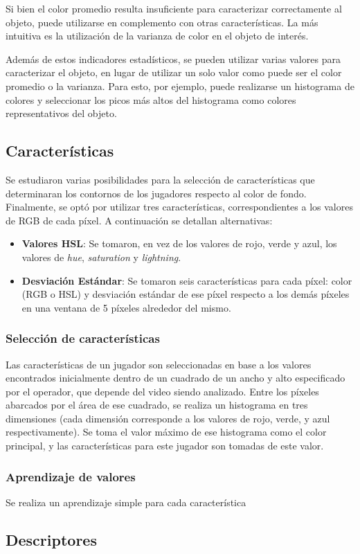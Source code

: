 Si bien el color promedio resulta insuficiente para caracterizar correctamente
al objeto, puede utilizarse en complemento con otras características. La más
intuitiva es la utilización de la varianza de color en el objeto de interés.

Además de estos indicadores estadísticos, se pueden utilizar varias valores
para caracterizar el objeto, en lugar de utilizar un solo valor como puede ser
el color promedio o la varianza. Para esto, por ejemplo, puede realizarse un
histograma de colores y seleccionar los picos más altos del histograma como
colores representativos del objeto.

\subsection{Características}

Se estudiaron varias posibilidades para la selección de características que
determinaran los contornos de los jugadores respecto al color de fondo.
Finalmente, se optó por utilizar tres características, correspondientes a los
valores de RGB de cada píxel. A continuación se detallan alternativas:
\begin{itemize}
  \item \textbf{Valores HSL}: Se tomaron, en vez de los valores de rojo, verde
    y azul, los valores de \textit{hue}, \textit{saturation} y
    \textit{lightning}.

  \item \textbf{Desviación Estándar}: Se tomaron seis características para cada
    píxel: color (RGB o HSL) y desviación estándar de ese píxel respecto a los
    demás píxeles en una ventana de 5 píxeles alrededor del mismo.

\end{itemize}

\subsubsection{Selección de características}

Las características de un jugador son seleccionadas en base a los valores
encontrados inicialmente dentro de un cuadrado de un ancho y alto especificado
por el operador, que depende del video siendo analizado. Entre los píxeles
abarcados por el área de ese cuadrado, se realiza un histograma en tres
dimensiones (cada dimensión corresponde a los valores de rojo, verde, y azul
respectivamente). Se toma el valor máximo de ese histograma como el color
principal, y las características para este jugador son tomadas de este valor.

\subsubsection{Aprendizaje de valores}

Se realiza un aprendizaje simple para cada característica

\subsection{Descriptores}
